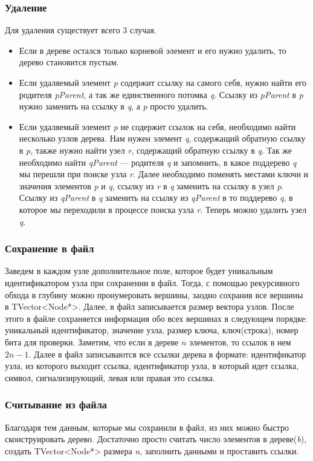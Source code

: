 \subsubsection{Удаление}
Для удаления существует всего 3 случая. \\
\begin{itemize}
  \item Если в дереве остался только корневой элемент и его нужно удалить, то дерево становится пустым.
  \item Если удаляемый элемент \textit{p} содержит ссылку на самого себя, нужно найти его родителя \textit{pParent}, а так же единственного потомка \textit{q}. Ссылку из \textit{pParent} в \textit{p} нужно заменить на ссылку в \textit{q}, а  \textit{p} просто удалить.
  \item Если удаляемый элемент \textit{p} не содержит ссылок на себя, необходимо найти несколько узлов дерева. Нам нужен элемент \textit{q}, содержащий обратную ссылку в \textit{p}, также нужно найти узел \textit{r}, содержащий обратную ссылку в \textit{q}. Так же необходимо найти  \textit{qParent} --- родителя \textit{q} и запомнить, в какое поддерево \textit{q} мы перешли при поиске узла \textit{r}. Далее необходимо поменять местами ключи и значения элементов \textit{p} и \textit{q}, ссылку из \textit{r} в \textit{q} заменить на ссылку в узел \textit{p}. Ссылку из \textit{qParent} в \textit{q} заменить на ссылку из \textit{qParent} в то поддерево \textit{q}, в которое мы переходили в процессе поиска узла \textit{r}. Теперь можно удалить узел \textit{q}.\cite{India}
\end{itemize} 
\subsubsection{Сохранение в файл}
Заведем в каждом узле дополнительное поле, которое будет уникальным идентификатором узла при сохранении в файл. Тогда, с помощью рекурсивного обхода в глубину можно пронумеровать вершины, заодно сохранив все вершины в TVector<Node*>. Далее, в файл записывается размер вектора узлов. После этого в файле сохраняется информация обо всех вершинах в следующем порядке: уникальный идентификатор, значение узла, размер ключа, ключ(строка), номер бита для проверки. Заметим, что если в дереве $n$ элементов, то ссылок в нем $2n-1$. Далее в файл записываются все ссылки дерева в формате: идентификатор узла, из которого выходит ссылка, идентификатор узла, в который идет ссылка, символ, сигнализирующий, левая или правая это ссылка.
\subsubsection{Считывание из файла}
Благодаря тем данным, которые мы сохранили в файл, из них можно быстро сконструировать дерево. Достаточно просто считать число элементов в дереве(\textit{b}), создать TVector<Node*> размера \textit{n}, заполнить данными и проставить ссылки. 

